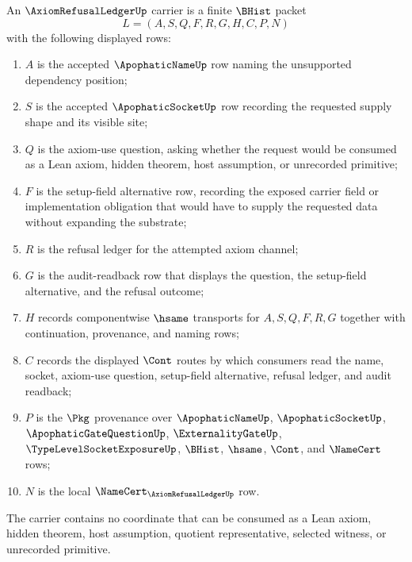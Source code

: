 \begin{definition}
\label{def:axiom-refusal-ledger-carrier}
An $\AxiomRefusalLedgerUp$ carrier is a finite $\BHist$ packet
$$
L=(A,S,Q,F,R,G,H,C,P,N)
$$
with the following displayed rows:
\begin{enumerate}
\item $A$ is the accepted $\ApophaticNameUp$ row naming the unsupported dependency position;
\item $S$ is the accepted $\ApophaticSocketUp$ row recording the requested supply shape and its visible site;
\item $Q$ is the axiom-use question, asking whether the request would be consumed as a Lean axiom, hidden theorem, host assumption, or unrecorded primitive;
\item $F$ is the setup-field alternative row, recording the exposed carrier field or implementation obligation that would have to supply the requested data without expanding the substrate;
\item $R$ is the refusal ledger for the attempted axiom channel;
\item $G$ is the audit-readback row that displays the question, the setup-field alternative, and the refusal outcome;
\item $H$ records componentwise $\hsame$ transports for $A,S,Q,F,R,G$ together with continuation, provenance, and naming rows;
\item $C$ records the displayed $\Cont$ routes by which consumers read the name, socket, axiom-use question, setup-field alternative, refusal ledger, and audit readback;
\item $P$ is the $\Pkg$ provenance over $\ApophaticNameUp$, $\ApophaticSocketUp$, $\ApophaticGateQuestionUp$, $\ExternalityGateUp$, $\TypeLevelSocketExposureUp$, $\BHist$, $\hsame$, $\Cont$, and $\NameCert$ rows;
\item $N$ is the local $\NameCert_{\AxiomRefusalLedgerUp}$ row.
\end{enumerate}
The carrier contains no coordinate that can be consumed as a Lean axiom, hidden theorem, host assumption, quotient representative, selected witness, or unrecorded primitive.
\end{definition}

